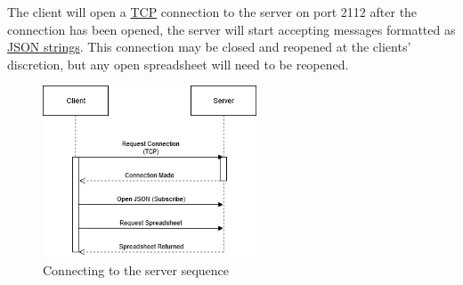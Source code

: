 The client will open a \href{https://en.wikipedia.org/wiki/Transmission_Control_Protocol}{TCP} 
connection to the server on port 2112 after the connection has been opened, 
the server will start accepting messages formatted as \href{https://en.wikipedia.org/wiki/JSON}{JSON strings}. 
This connection may be closed and reopened at the clients’ discretion, but any open spreadsheet will need to be reopened.

\begin{figure}[H]
    \begin{center}
        \includegraphics[width=2.5in]{Figures/connect.png}
        \caption{Connecting to the server sequence}
    \end{center}
\end{figure}